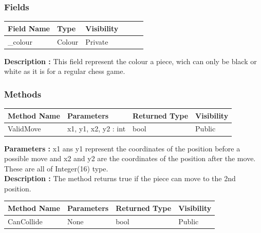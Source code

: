 \documentclass[12pt]{article}
\begin{document}
\subsubsection{Fields}

\begin{table}[H]
    \begin{tabular}{llllll}
    \hline
    \multicolumn{1}{|l|}{\cellcolor[HTML]{EFEFEF}\textbf{Field Name}} & \multicolumn{1}{l|}{\cellcolor[HTML]{EFEFEF}\textbf{Type}} & \multicolumn{1}{l|}{\cellcolor[HTML]{EFEFEF}\textbf{Visibility}} \\ \hline
    \multicolumn{1}{|l|}{\_colour}                                    & \multicolumn{1}{l|}{Colour}                                & \multicolumn{1}{l|}{Private}                                     \\ \hline
    \end{tabular}
\end{table}

\textbf{Description :} This field represent the colour a piece, wich can only be
black or white as it is for a regular chess game.


\subsubsection{Methods}

\begin{table}[H]
    \begin{tabular}{|l|l|l|l|}
    \hline
    \rowcolor[HTML]{EFEFEF} 
    \cellcolor[HTML]{EFEFEF}\textbf{Method Name} & \textbf{Parameters}  & \textbf{Returned Type} & \textbf{Visibility} \\ \hline
    ValidMove                          & x1, y1, x2, y2 : int & bool                   & Public              \\ \hline
    \end{tabular}
\end{table}

\textbf{Parameters :} x1 ans y1 represent the coordinates of the position before a possible move
and x2 and y2 are the coordinates of the position after the move. These are all of Integer(16) type.
\\
\textbf{Description :} The method returns true if the piece can move to the 2nd position.

\begin{table}[H]
    \begin{tabular}{|l|l|l|l|}
    \hline
    \rowcolor[HTML]{EFEFEF} 
    \cellcolor[HTML]{EFEFEF}\textbf{Method Name} & \textbf{Parameters}  & \textbf{Returned Type} & \textbf{Visibility} \\ \hline
    CanCollide                                   & None                 & bool                   & Public              \\ \hline
    \end{tabular}
\end{table}
\end{document}
